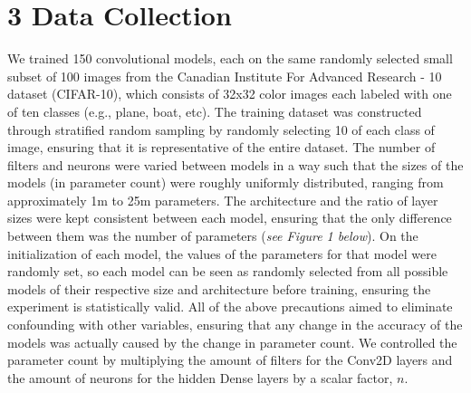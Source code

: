 \documentclass[12pt]{article}
\begin{document}
    \section*{3 Data Collection}

    We trained 150 convolutional models, each on the same randomly selected small subset of 100 images
    from the Canadian Institute For Advanced Research - 10 dataset (CIFAR-10), which consists of 32x32 color images each labeled with one of ten classes (e.g., plane, boat, etc).
    The training dataset was constructed through stratified random sampling by randomly selecting 10 of each class of image, ensuring that it is representative of the entire dataset.
    The number of filters and neurons were varied between models in a way such that the sizes of the models (in parameter count) were roughly uniformly distributed, ranging from approximately 1m to 25m parameters.
    The architecture and the ratio of layer sizes were kept consistent between each model, ensuring that the only difference between them was the number of parameters (\textit{see Figure 1 below}).
    On the initialization of each model, the values of the parameters for that model were randomly set, so each model can be seen as randomly
    selected from all possible models of their respective size and architecture before training, ensuring the experiment is statistically valid.
    All of the above precautions aimed to eliminate confounding with other variables, ensuring that any change in the accuracy of the models was actually caused by the change in parameter count.
    We controlled the parameter count by multiplying the amount of filters for the Conv2D layers and the amount of neurons
    for the hidden Dense layers by a scalar factor, $n$.
\end{document}
